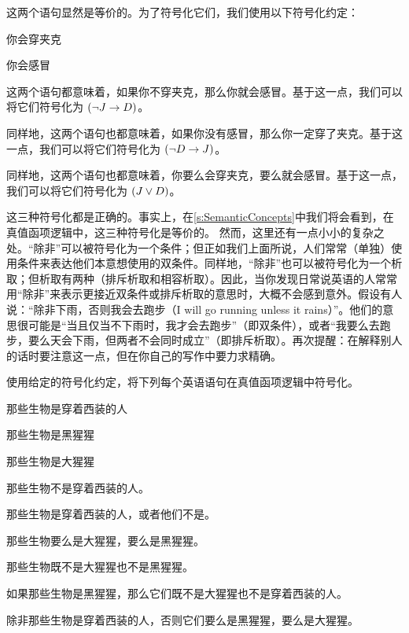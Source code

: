 这两个语句显然是等价的。为了符号化它们，我们使用以下符号化约定：


\begin{ekey}
		\item[J] 你会穿夹克
		\item[D] 你会感冒
	\end{ekey}

这两个语句都意味着，如果你不穿夹克，那么你就会感冒。基于这一点，我们可以将它们符号化为 $(\neg J \rightarrow D)$。

同样地，这两个语句也都意味着，如果你没有感冒，那么你一定穿了夹克。基于这一点，我们可以将它们符号化为 $(\neg D \rightarrow J)$。

同样地，这两个语句也都意味着，你要么会穿夹克，要么就会感冒。基于这一点，我们可以将它们符号化为 $(J \vee D)$。

这三种符号化都是正确的。事实上，在\cref{s:SemanticConcepts}中我们将会看到，在真值函项逻辑中，这三种符号化是等价的。
然而，这里还有一点小小的复杂之处。“除非”可以被符号化为一个条件；但正如我们上面所说，人们常常（单独）使用条件来表达他们本意想使用的双条件。同样地，“除非”也可以被符号化为一个析取；但析取有两种（排斥析取和相容析取）。因此，当你发现日常说英语的人常常用“除非”来表示更接近双条件或排斥析取的意思时，大概不会感到意外。假设有人说：“除非下雨，否则我会去跑步（I will go running unless it rains）”。他们的意思很可能是“当且仅当不下雨时，我才会去跑步”（即双条件），或者“我要么去跑步，要么天会下雨，但两者不会同时成立”（即排斥析取）。再次提醒：在解释别人的话时要注意这一点，但在你自己的写作中要力求精确。

\practiceproblems
\solutions
\problempart 使用给定的符号化约定，将下列每个英语语句在真值函项逻辑中符号化。\label{pr.monkeysuits}


\begin{ekey}
		\item[M] 那些生物是穿着西装的人
		\item[C] 那些生物是黑猩猩
		\item[G] 那些生物是大猩猩
	\end{ekey}

\begin{compactlist}
\item 那些生物不是穿着西装的人。
\item 那些生物是穿着西装的人，或者他们不是。
\item 那些生物要么是大猩猩，要么是黑猩猩。
\item 那些生物既不是大猩猩也不是黑猩猩。
\item 如果那些生物是黑猩猩，那么它们既不是大猩猩也不是穿着西装的人。
\item 除非那些生物是穿着西装的人，否则它们要么是黑猩猩，要么是大猩猩。
\end{compactlist}

